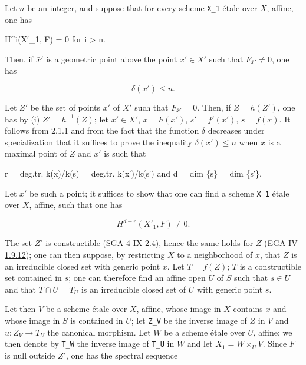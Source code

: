 \documentclass[
  11pt,
  a4paper,
]{book}
\newenvironment{Shaded}{}{}
\newcommand{\NormalTok}[1]{#1}
\begin{document}
Let \(n\) be an integer, and suppose that for every scheme \texttt{X\_1}
étale over \(X\), affine, one has

\begin{Shaded}
\begin{Highlighting}[]
\NormalTok{H\^{}i(X′\_1, F) = 0 for i \textgreater{} n.}
\end{Highlighting}
\end{Shaded}

Then, if \(\bar{x}'\) is a geometric point above the point \(x' \in X'\)
such that \(F_{\bar{x}'} \neq 0\), one has

\[ \delta(x') \leqslant n. \]

Let \(Z'\) be the set of points \(x'\) of \(X'\) such that
\(F_{\bar{x}'} = 0\). Then, if \(Z = h(Z')\), one has by (i) \(Z' =
h^{-1}(Z)\); let \(x' \in X'\), \(x = h(x')\), \(s' = f'(x')\),
\(s = f(x)\). It follows from 2.1.1 and from the fact that the function
\(\delta\) decreases under specialization that it suffices to prove the
inequality \(\delta(x') \leqslant n\) when \(x\) is a maximal point of
\(Z\) and \(x'\) is such that

\begin{Shaded}
\begin{Highlighting}[]
\NormalTok{r = deg.tr. k(x)/k(s) = deg.tr. k(x′)/k(s′) and d = dim \{s\} = dim \{s′\}.}
\end{Highlighting}
\end{Shaded}

Let \(x'\) be such a point; it suffices to show that one can find a
scheme \texttt{X\_1} étale over \(X\), affine, such that one has

\[ H^{d+r}(X'_{1}, F) \neq 0. \]

The set \(Z'\) is constructible (SGA 4 IX 2.4), hence the same holds for
\(Z\)
(\href{https://jcreinhold.github.io/ega/iv/12-ch4-01-relative-finiteness-conditions.html\#19-pro-constructible-and-ind-constructible-sets}{EGA
IV 1.9.12}); one can then suppose, by restricting \(X\) to a
neighborhood of \(x\), that \(Z\) is an irreducible closed set with
generic point \(x\). Let \(T = f(Z)\); \(T\) is a constructible set
contained in \({s}\); one can therefore find an affine open \(U\) of
\(S\) such that \(s \in U\) and that \(T \cap U = T_{U}\) is an
irreducible closed set of \(U\) with generic point \(s\).

Let then \(V\) be a scheme étale over \(X\), affine, whose image in
\(X\) contains \(x\) and whose image in \(S\) is contained in \(U\); let
\texttt{Z\_V} be the inverse image of \(Z\) in \(V\) and
\(u : Z_{V} \to T_{U}\) the canonical morphism. Let \(W\) be a scheme
étale over \(U\), affine; we then denote by \texttt{T\_W} the inverse
image of \texttt{T\_U} in \(W\) and let \(X_{1} = W \times_{U} V\).
Since \(F\) is null outside \(Z'\), one has the spectral sequence
\end{document}
